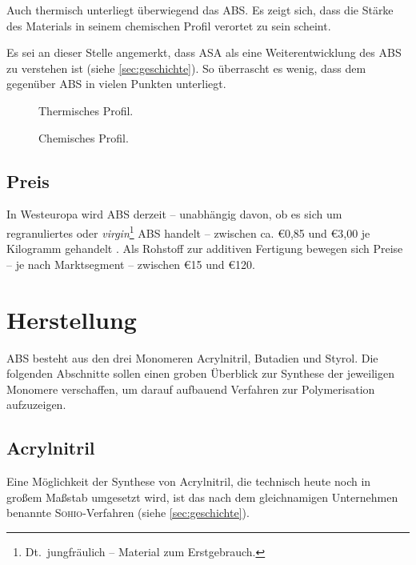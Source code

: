             Auch thermisch unterliegt überwiegend das ABS\@. Es zeigt sich, dass die Stärke des Materials in seinem chemischen
            Profil verortet zu sein scheint.

            Es sei an dieser Stelle angemerkt, dass ASA als eine Weiterentwicklung des ABS zu verstehen ist (siehe \cref{sec:geschichte}).
            So überrascht es wenig, dass dem gegenüber ABS in vielen Punkten unterliegt.
            \begin{figure}[H]
                \centering
                
                \caption[Thermisches Profil]{Thermisches Profil.}%
                \label{fig:pc thermal profile}
            \end{figure}
            \begin{figure}[H]
                \centering
                
                \caption[Chemisches Profil]{Chemisches Profil.}%
                \label{fig:pc chemical profile}
            \end{figure}
            \newpage
            \nocite{datenblattsammlung.KERN.20210201}
        \subsection{Preis}
            In Westeuropa wird ABS derzeit – unabhängig davon, ob es sich um regranuliertes oder \textit{virgin}\footnote{Dt.\ jungfräulich – Material zum Erstgebrauch.}
            ABS handelt – zwischen ca. €0,85 und €3,00 je Kilogramm gehandelt \cite{rohstoffboerse.kunststoffweb.de.20210206}.
            Als Rohstoff zur additiven Fertigung bewegen sich Preise – je nach Marktsegment – zwischen €15 und €120.

    \section{Herstellung}
        ABS besteht aus den drei Monomeren Acrylnitril, Butadien und Styrol. Die folgenden Abschnitte sollen einen groben
        Überblick zur Synthese der jeweiligen Monomere verschaffen, um darauf aufbauend Verfahren zur Polymerisation aufzuzeigen.
        
        \subsection*{Acrylnitril}
            Eine Möglichkeit der Synthese von Acrylnitril, die technisch heute noch in großem Maßstab umgesetzt wird, ist das nach dem gleichnamigen
            Unternehmen benannte \textsc{Sohio}-Verfahren (siehe \cref{sec:geschichte}).

